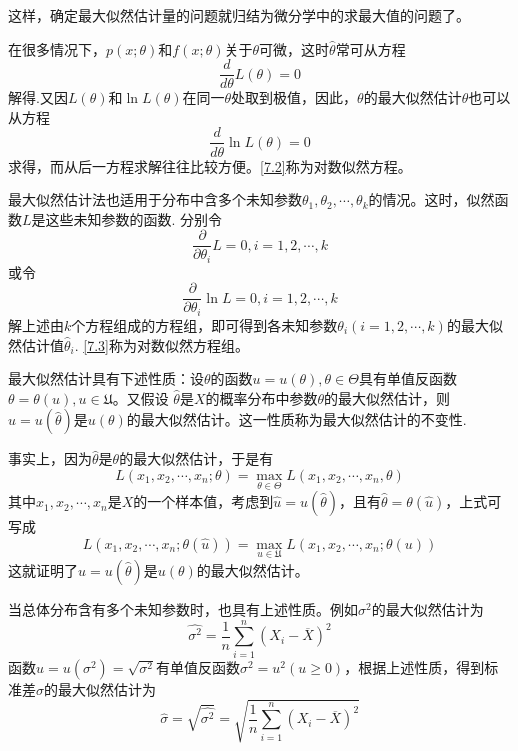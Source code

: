 \begin{definition}[最大似然估计法]
    这样，确定最大似然估计量的问题就归结为微分学中的求最大值的问题了。

    在很多情况下，$p(x;\theta)$和$f(x;\theta)$关于$\theta$可微，这时$\hat{\theta}$常可从方程
    $$\frac{d}{d\theta}L(\theta)=0$$
    解得.又因$L(\theta)$和$\ln L(\theta)$在同一$\theta$处取到极值，因此，$\theta$的最大似然估计$\theta$也可以从方程
    \begin{equation}\tag{2}\label{7.2}
    \frac{d}{d\theta} \ln L(\theta)=0
    \end{equation}
    求得，而从后一方程求解往往比较方便。\eqref{7.2}称为{\heiti 对数似然方程}。

    最大似然估计法也适用于分布中含多个未知参数$\theta_1,\theta_2,\cdots,\theta_k$的情况。这时，似然函数$L$是这些未知参数的函数.
    分别令
    $$\frac{\partial}{\partial \theta_i}L=0,i=1,2,\cdots,k$$
    或令
    \begin{equation}\tag{3}\label{7.3}
    \frac{\partial}{\partial \theta_i}\ln L=0,i=1,2,\cdots,k
    \end{equation}
    解上述由$k$个方程组成的方程组，即可得到各未知参数$\theta_i(i=1,2,\cdots,k)$的最大似然估计值$\hat{\theta}_i$.
    \eqref{7.3}称为{\heiti 对数似然方程组}。
\end{definition}

\begin{theorem}
    最大似然估计具有下述性质：设$\theta$的函数$u=u(\theta),\theta\in \varTheta$具有单值反函数$\theta=\theta(u),u\in \mathfrak{U}$。又假设
    $\hat{\theta}$是$X$的概率分布中参数$\theta$的最大似然估计，则$\hat{u}=u(\hat{\theta})$是$u(\theta)$的最大似然估计。这一性质称为最大似然估计的{\heiti 不变性}.

    事实上，因为$\hat{\theta}$是$\theta$的最大似然估计，于是有
    $$L(x_1,x_2,\cdots,x_n;\theta)=\max\limits_{\theta\in \varTheta}L(x_1,x_2,\cdots,x_n,\theta)$$
    其中$x_1,x_2,\cdots,x_n$是$X$的一个样本值，考虑到$\hat{u}=u(\hat{\theta})$，且有$\hat{\theta}=\theta(\hat{u})$，上式可写成
    $$L(x_1,x_2,\cdots,x_n;\theta(\hat{u}))=\max\limits_{u\in \mathfrak{U}}L(x_1,x_2,\cdots,x_n;\theta(u))$$
    这就证明了$\hat{u}=u(\hat{\theta})$是$u(\theta)$的最大似然估计。

    当总体分布含有多个未知参数时，也具有上述性质。例如$\sigma^2$的最大似然估计为
    $$\hat{\sigma^2}=\frac{1}{n}\sum_{i=1}^n{(X_i-\overline{X})}^2$$
    函数$u=u(\sigma^2)=\sqrt{\sigma^2}$有单值反函数$\sigma^2=u^2(u\geq 0)$，根据上述性质，得到标准差$\sigma$的最大似然估计为
    $$\hat{\sigma}=\sqrt{\hat{\sigma^2}}=\sqrt{\frac{1}{n}\sum_{i=1}^n{(X_i-\overline{X})}^2}$$
\end{theorem}

